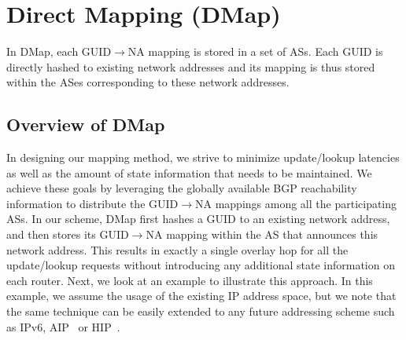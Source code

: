 \section{Direct Mapping (DMap)}
\label{sec:design}
In DMap, each GUID$\rightarrow$NA mapping is stored in a set of ASs. %
Each GUID is directly hashed to existing network addresses and its mapping is thus stored within the ASes corresponding to these network addresses. %

\subsection{Overview of DMap}


In designing our mapping method, we strive to minimize update/lookup latencies as well as the amount of state information that needs to be maintained.  We achieve these goals by leveraging the globally available BGP reachability information to distribute the GUID$\rightarrow$NA mappings among all the participating ASs. In our scheme, DMap first hashes a GUID to an existing network address, and then stores its GUID$\rightarrow$NA mapping within the AS that announces this network address. This results in exactly a single overlay hop for all the update/lookup requests without introducing any additional state information on each router.  Next, we look at an example to illustrate this approach. In this example, we assume the usage of the existing IP address space, but we note that the same technique can be easily extended to any future addressing scheme such as IPv6, AIP~\cite{andersen} or HIP~\cite{moskowitz}.
   
